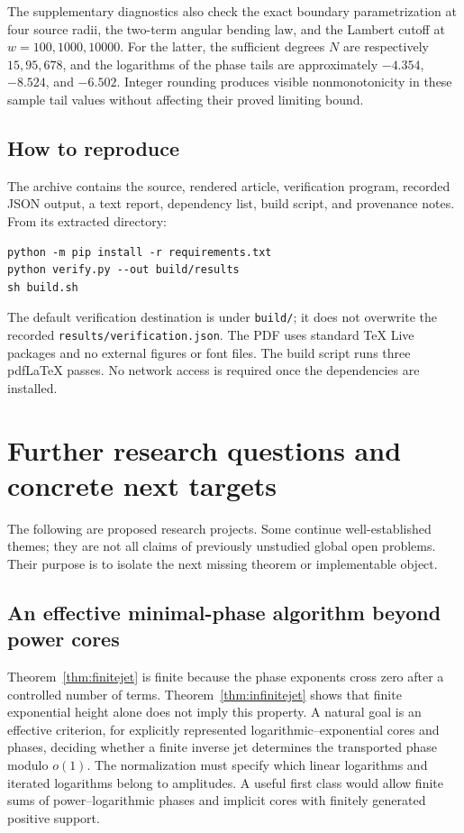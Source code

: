 \documentclass[11pt,a4paper]{article}
\theoremstyle{definition}
\theoremstyle{remark}
\numberwithin{equation}{section}
\begin{document}
The supplementary diagnostics also check the exact boundary parametrization at four source radii, the two-term angular bending law, and the Lambert cutoff at $w=100,1000,10000$. For the latter, the sufficient degrees $N$ are respectively $15,95,678$, and the logarithms of the phase tails are approximately $-4.354$, $-8.524$, and $-6.502$. Integer rounding produces visible nonmonotonicity in these sample tail values without affecting their proved limiting bound.

\subsection{How to reproduce}

The archive contains the source, rendered article, verification program, recorded JSON output, a text report, dependency list, build script, and provenance notes. From its extracted directory:
\begin{verbatim}
python -m pip install -r requirements.txt
python verify.py --out build/results
sh build.sh
\end{verbatim}
The default verification destination is under \texttt{build/}; it does not overwrite the recorded \texttt{results/verification.json}. The PDF uses standard TeX Live packages and no external figures or font files. The build script runs three pdfLaTeX passes. No network access is required once the dependencies are installed.

\section{Further research questions and concrete next targets}\label{sec:research}

The following are proposed research projects. Some continue well-established themes; they are not all claims of previously unstudied global open problems. Their purpose is to isolate the next missing theorem or implementable object.

\subsection{An effective minimal-phase algorithm beyond power cores}

Theorem~\ref{thm:finitejet} is finite because the phase exponents cross zero after a controlled number of terms. Theorem~\ref{thm:infinitejet} shows that finite exponential height alone does not imply this property. A natural goal is an effective criterion, for explicitly represented logarithmic--exponential cores and phases, deciding whether a finite inverse jet determines the transported phase modulo $o(1)$. The normalization must specify which linear logarithms and iterated logarithms belong to amplitudes. A useful first class would allow finite sums of power--logarithmic phases and implicit cores with finitely generated positive support.
\end{document}
